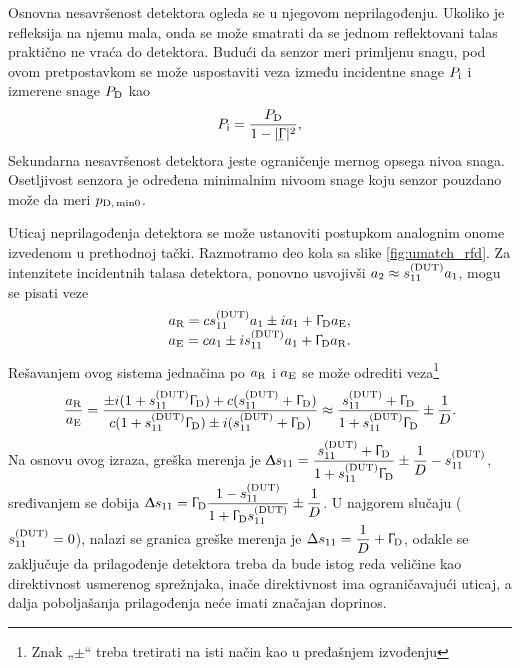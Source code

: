 \documentclass[a4paper, 12pt, diplomski]{etf}
\newcommand{\faz}[1]{\underaccent{\bar}{#1}}
\begin{document}
Osnovna nesavršenost detektora ogleda se u njegovom 
neprilagođenju. Ukoliko je refleksija na njemu mala, onda se može
smatrati da se jednom reflektovani talas praktično ne vraća do 
detektora. Budući da senzor meri primljenu snagu, pod ovom pretpostavkom se može uspostaviti veza između incidentne snage
$P_{\rm i}$ i izmerene snage $P_{\rm D}$ kao
\begin{equation}
    P_{\rm i} = \dfrac{P_{\rm D}}{1 - |\faz \Upgamma|^2},
    \label{eq:corP}
\end{equation}
Sekundarna nesavršenost detektora jeste ograničenje mernog opsega nivoa 
snaga. Osetljivost senzora je određena minimalnim nivoom snage koju senzor pouzdano može da meri $p_{{\rm D,\, min0}}$.

Uticaj neprilagođenja detektora se može ustanoviti
postupkom analognim onome
izvedenom u prethodnoj tački. Razmotramo deo kola sa slike
\ref{fig:umatch_rfd}.
%
Za intenzitete incidentnih talasa detektora, ponovno usvojivši
$a_2 \approx s_{11}^{\rm (DUT)} a_1$, mogu se pisati
veze
\begin{equation}
    \begin{array}{c}
         a_{\rm R} = cs_{11}^{\rm (DUT)}a_1 \pm ia_1 + \Upgamma_{\rm D} a_{\rm E},  \\
         a_{\rm E} = ca_1 \pm is_{11}^{\rm (DUT)}a_1 + \Upgamma_{\rm D} a_{\rm R}.
    \end{array}
\end{equation}
Rešavanjem ovog sistema jednačina po $a_{\rm R}$ i $a_{\rm E}$ se može odrediti veza\footnote{
Znak „$\pm$“ treba tretirati na isti način kao u pređašnjem izvođenju
}
\begin{equation}
\dfrac{a_{\rm R}}{a_{\rm E}} = 
\dfrac{ \pm i(1 + s_{11}^{\rm (DUT)} \Upgamma_{\rm D}) + c(s_{11}^{\rm (DUT)} + \Upgamma_{\rm D})}
      { c(1 + s_{11}^{\rm (DUT)} \Upgamma_{\rm D}) \pm i(s_{11}^{\rm (DUT)} + \Upgamma_{\rm D}) } 
      \approx \dfrac{s_{11}^{\rm (DUT)} + \Upgamma_{\rm D}}{1 + s_{11}^{\rm (DUT)} \Upgamma_{\rm D}} \pm \dfrac 1D.
\end{equation}
Na osnovu ovog izraza, greška merenja je 
$\Updelta s_{11} = 
\dfrac{s_{11}^{\rm (DUT)} + \Upgamma_{\rm D}}{1 + s_{11}^{\rm (DUT)} \Upgamma_{\rm D}} \pm \dfrac 1D - s_{11}^{\rm (DUT)}
$, sređivanjem se dobija 
$
\Updelta s_{11} = 
\Upgamma_{\rm D} 
\dfrac{1 -  s_{11}^{\rm (DUT)} }{1 + \Upgamma_{\rm D}
 s_{11}^{\rm (DUT) }
}
\pm \dfrac 1D
$.
U najgorem slučaju
($ s_{11}^{\rm (DUT)} = 0$), nalazi se
granica greške merenja je $\Delta s_{11} = \dfrac 1D + \Upgamma_{\rm D}$, odakle se zaključuje da 
prilagođenje detektora treba da bude istog reda veličine kao direktivnost usmerenog sprežnjaka, inače direktivnost 
ima ograničavajući uticaj, a dalja poboljašanja prilagođenja neće imati značajan doprinos. 
\end{document}
